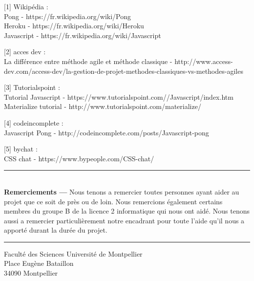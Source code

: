 \documentclass[a4paper,12pt,oneside]{book}
\makeatletter
\def\cleardoublepage{\clearpage\if@twoside \ifodd\c@page\else%
  \hbox{}%
  \thispagestyle{empty}%
  \newpage%
  \if@twocolumn\hbox{}\newpage\fi\fi\fi}
\makeatother
\begin{document}

\mainmatter

\pagestyle{fancy}

\cleardoublepage










\begin{thebibliography}

\hfill \break


[1] Wikipédia : \\
Pong - https://fr.wikipedia.org/wiki/Pong\\
Heroku - https://fr.wikipedia.org/wiki/Heroku\\
Javascript - https://fr.wikipedia.org/wiki/Javascript
\hfill \break


[2] acces dev : \\
La différence entre méthode agile et méthode classique - http://www.access-dev.com/access-dev/la-gestion-de-projet-methodes-classiques-vs-methodes-agiles
\hfill \break


[3] Tutorialspoint :  \\
Tutorial Javascript - https://www.tutorialspoint.com//Javascript/index.htm\\
Materialize tutorial - http://www.tutorialspoint.com/materialize/
\hfill \break


[4] codeincomplete : \\
Javascript Pong - http://codeincomplete.com/posts/Javascript-pong
\hfill \break


[5] bychat : \\
CSS chat - https://www.bypeople.com/CSS-chat/
\hfill \break

\end{thebibliography}
\clearpage

\thispagestyle{empty}

\vspace*{\fill}
\noindent\rule[2pt]{\textwidth}{0.5pt}\\
{\textbf{Remerciements ---}}
Nous tenons a remercier toutes personnes ayant aider au projet que ce soit de près ou de loin. Nous remercions également certains membres du groupe B de la licence 2 informatique qui nous ont aidé.
Nous tenons aussi a remercier particulièrement notre encadrant pour toute l'aide qu'il nous a apporté durant la durée du projet.
\\
\noindent\rule[2pt]{\textwidth}{0.5pt}
\begin{center}
    Faculté des Sciences
    Université de Montpellier\\
    Place Eugène Bataillon\\
    34090 Montpellier\\
\end{center}
\vspace*{\fill}
\end{document}
